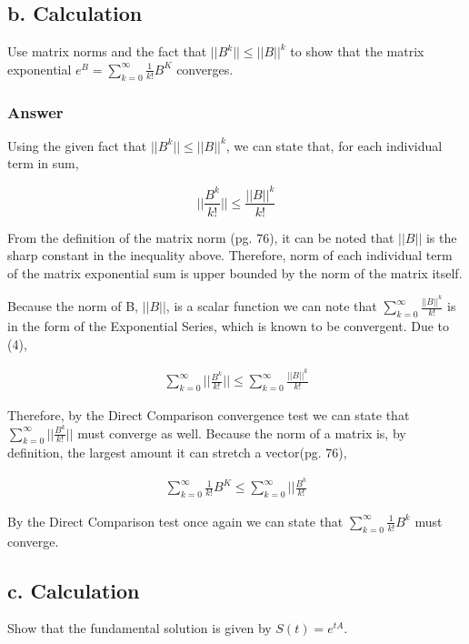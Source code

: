 \documentclass{article}
\newcommand{\n}{\newline}
\begin{document}
		\subsection{b. Calculation}
		Use matrix norms and the fact that $||B^{k}||\leq||B||^{k}$ to show that the matrix exponential $e^{B}=\sum_{k=0}^{\infty}\frac{1}{k!}B^{K}$ converges.
		\subsubsection{Answer}
		
		Using the given fact that $||B^{k}||\leq||B||^{k}$, we can state that, for each individual term in sum, 
		
		\begin{equation}
			||\frac{B^{k}}{k!}||\leq\frac{||B||^{k}}{k!}
		\end{equation}
		
		From the definition of the matrix norm \cite{BG}(pg. 76), it can be noted that $||B||$ is the sharp constant in the inequality above.  Therefore, norm of each individual term of the matrix exponential sum is upper bounded by the norm of the matrix itself. \n
		
		Because the norm of B, $||B||$, is a scalar function we can note that $\sum_{k=0}^{\infty}\frac{||B||^k}{k!}$ is in the form of the Exponential Series, which is known to be convergent.  Due to (4),
		
		\begin{align*}
			\sum_{k=0}^{\infty}||\frac{B^k}{k!}||\leq\sum_{k=0}^{\infty}\frac{||B||^k}{k!}
		\end{align*} 
		
		Therefore, by the Direct Comparison convergence test\cite{ComTest} we can state that $\sum_{k=0}^{\infty}||\frac{B^k}{k!}||$ must converge as well.  Because the norm of a matrix is, by definition, the largest amount it can stretch a vector\cite{BG}(pg. 76), 
		
		\begin{align*}
			\sum_{k=0}^{\infty}\frac{1}{k!}B^{K}\leq\sum_{k=0}^{\infty}||\frac{B^k}{k!}
		\end{align*}
		
		By the Direct Comparison test once again we can state that $\sum_{k=0}^{\infty}\frac{1}{k!}B^{k}$ must converge.
		
		\subsection{c. Calculation}
		Show that the fundamental solution is given by $S(t)=e^{tA}$.
\end{document}
